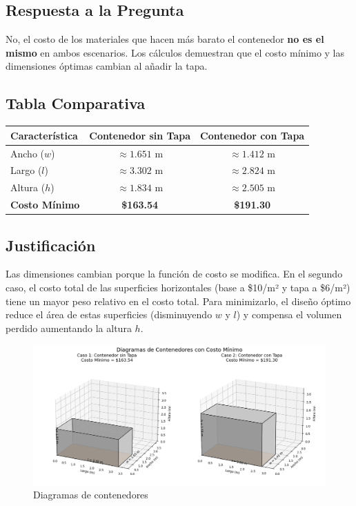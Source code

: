 \documentclass[12pt, letterpaper]{article}
\begin{document}
\subsection*{Respuesta a la Pregunta}
No, el costo de los materiales que hacen más barato el contenedor \textbf{no es el mismo} en ambos escenarios. Los cálculos demuestran que el costo mínimo y las dimensiones óptimas cambian al añadir la tapa.

\subsection*{Tabla Comparativa}
\begin{center}
\begin{tabular}{|l|c|c|}
\hline
\textbf{Característica} & \textbf{Contenedor sin Tapa} & \textbf{Contenedor con Tapa} \\
\hline
Ancho ($w$) & $\approx 1.651$ m & $\approx 1.412$ m \\
Largo ($l$) & $\approx 3.302$ m & $\approx 2.824$ m \\
Altura ($h$) & $\approx 1.834$ m & $\approx 2.505$ m \\
\hline
\textbf{Costo Mínimo} & \textbf{\$163.54} & \textbf{\$191.30} \\
\hline
\end{tabular}
\end{center}

\subsection*{Justificación}
Las dimensiones cambian porque la función de costo se modifica. En el segundo caso, el costo total de las superficies horizontales (base a \$10/m² y tapa a \$6/m²) tiene un mayor peso relativo en el costo total. Para minimizarlo, el diseño óptimo reduce el área de estas superficies (disminuyendo $w$ y $l$) y compensa el volumen perdido aumentando la altura $h$.

\begin{figure}[h!]
    \centering
    \includegraphics[width=1\textwidth]{Figure_5.png}
    \caption{Diagramas de contenedores}
    \label{fig:Figure_2}
\end{figure}
\end{document}
